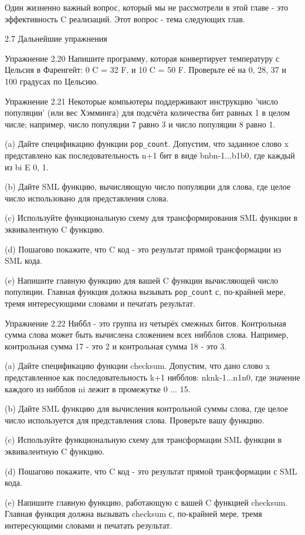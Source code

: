 Один жизненно важный вопрос, который мы не рассмотрели в этой главе - это эффективность C реализаций. Этот вопрос - тема следующих глав.

2.7 Дальнейшие упражнения

Упражнение 2.20 Напишите программу, которая конвертирует температуру с Цельсия в Фаренгейт: 0 C = 32 F, и 10 C = 50 F. Проверьте её на 0, 28, 37 и 100 градусах по Цельсию.

Упражнение 2.21 Некоторые компьютеры поддерживают инструкцию 'число популяции' (или вес Хэмминга) для подсчёта количества бит равных 1 в целом числе; например, число популяции 7 равно 3 и число популяции 8 равно 1.

(a) Дайте спецификацию функции \lstinline|pop_count|. Допустим, что заданное слово x представлено как последовательность n+1 бит в виде bnbn-1...b1b0, где каждый из bi E {0, 1}.

(b) Дайте SML функцию, вычисляющую число популяции для слова, где целое число использовано для представления слова.

(c) Используйте функциональную схему для трансформирования SML функции в эквивалентную C функцию.

(d) Пошагово покажите, что C код - это результат прямой трансформации из SML кода.

(e) Напишите главную функцию для вашей C функции вычисляющей число популяции. Главная функция должна вызывать \lstinline|pop_count| с, по-крайней мере, тремя интересующими словами и печатать результат.

Упражнение 2.22 Ниббл - это группа из четырёх смежных битов. Контрольная сумма слова может быть вычислена сложением всех нибблов слова. Например, контрольная сумма 17 - это 2 и контрольная сумма 18 - это 3.

(a) Дайте спецификацию функции checksum. Допустим, что дано слово x представленное как последовательность k+1 нибблов: nknk-1...n1n0, где значение каждого из нибблов ni лежит в промежутке 0 ... 15.

(b) Дайте SML функцию для вычисления контрольной суммы слова, где целое число используется для представления слова. Проверьте вашу функцию.

(c) Используйте функциональную схему для трансформации SML функции в эквивалентную C функцию.

(d) Пошагово покажите, что C код - это результат прямой трансформации с SML кода.

(e) Напишите главную функцию, работающую с вашей C функцией checksum. Главная функция должна вызывать checksum с, по-крайней мере, тремя интересующими словами и печатать результат.

